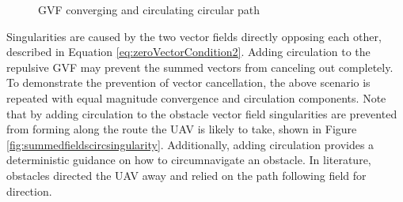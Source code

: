 \documentclass[numbered,pdftex]{ohio-etd}
\begin{document}
\begin{figure}[H]
	\begin{subfigmatrix}{2}%
		\centering	
		\hspace*{0mm}
	\end{subfigmatrix}
	\caption{GVF converging and circulating circular path}
	\label{fig:noCircSingularityDetection}
\end{figure}

Singularities are caused by the two vector fields directly opposing each other, described in Equation \ref{eq:zeroVectorCondition2}. Adding circulation to the repulsive GVF may prevent the summed vectors from canceling out completely. To demonstrate the prevention of vector cancellation, the above scenario is repeated with equal magnitude convergence and circulation components. Note that by adding circulation to the obstacle vector field singularities are prevented from forming along the route the UAV is likely to take, shown in Figure \ref{fig:summedfieldscircsingularity}. Additionally, adding circulation provides a deterministic guidance on how to circumnavigate an obstacle. In literature, obstacles directed the UAV away and relied on the path following field for direction. 
\end{document}
